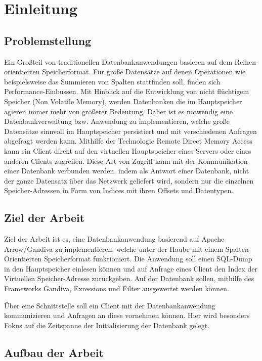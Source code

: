 \chapter{Einleitung}
\label{Einleitung}

\section{Problemstellung}
Ein Großteil von traditionellen Datenbankanwendungen basieren auf dem  Reihen-orien\-tierten Speicherformat. Für große Datensätze auf denen Operationen wie beispielsweise das Summieren von Spalten stattfinden soll, finden sich Performance-Einbussen.
Mit Hinblick auf die Entwicklung von nicht flüchtigem Speicher (Non Volatile Memory), werden Datenbanken die im Hauptspeicher agieren immer mehr von größerer Bedeutung. Daher ist es notwendig eine Datenbankverwaltung bzw. Anwendung zu implementieren, welche große Datensätze sinnvoll im Hauptspeicher persistiert und mit verschiedenen Anfragen abgefragt werden kann.
Mithilfe der Technologie Remote Direct Memory Access kann ein Client direkt auf den virtuellen Hauptspeicher eines Servers oder eines anderen Clients zugreifen. Diese Art von Zugriff kann mit der Kommunikation einer Datenbank verbunden werden, indem als Antwort einer Datenbank, nicht der ganze Datensatz über das Netzwerk geliefert wird, sondern nur die einzelnen Speicher-Adressen in Form von Indices mit ihren Offsets und Datentypen.

\section{Ziel der Arbeit}
Ziel der Arbeit ist es, eine Datenbankanwendung basierend auf Apache Arrow/Gandiva zu implementieren, welche unter der Haube mit einem Spalten-Orientierten Speicherformat funktioniert. Die Anwendung soll einen SQL-Dump in den Hauptspeicher einlesen können und auf Anfrage eines Client den Index der Virtuellen Speicher-Adresse zurückgeben. Auf der Datenbank sollen, mithilfe des Frameworks Gandiva, Exressions und Filter ausgewertet werden können.

Über eine Schnittstelle soll ein Client mit der Datenbankanwendung kommunizieren und Anfragen an diese vornehmen können. Hier wird besonders Fokus auf die Zeitspanne der Initialisierung der Datenbank gelegt.


\section{Aufbau der Arbeit}

